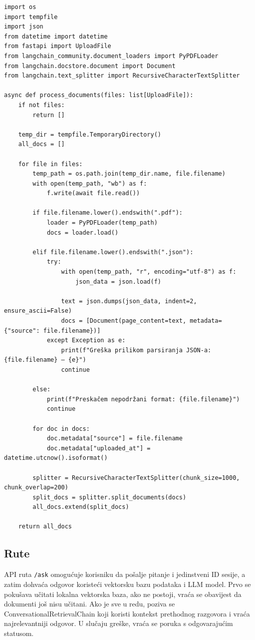 \documentclass[]{foi}
\begin{document}
\begin{longlisting}
\begin{verbatim}
import os
import tempfile
import json
from datetime import datetime
from fastapi import UploadFile
from langchain_community.document_loaders import PyPDFLoader
from langchain.docstore.document import Document
from langchain.text_splitter import RecursiveCharacterTextSplitter

async def process_documents(files: list[UploadFile]):
    if not files:
        return []

    temp_dir = tempfile.TemporaryDirectory()
    all_docs = []

    for file in files:
        temp_path = os.path.join(temp_dir.name, file.filename)
        with open(temp_path, "wb") as f:
            f.write(await file.read())

        if file.filename.lower().endswith(".pdf"):
            loader = PyPDFLoader(temp_path)
            docs = loader.load()

        elif file.filename.lower().endswith(".json"):
            try:
                with open(temp_path, "r", encoding="utf-8") as f:
                    json_data = json.load(f)

                text = json.dumps(json_data, indent=2, ensure_ascii=False)
                docs = [Document(page_content=text, metadata={"source": file.filename})]
            except Exception as e:
                print(f"Greška prilikom parsiranja JSON-a: {file.filename} — {e}")
                continue

        else:
            print(f"Preskačem nepodržani format: {file.filename}")
            continue 

        for doc in docs:
            doc.metadata["source"] = file.filename
            doc.metadata["uploaded_at"] = datetime.utcnow().isoformat()

        splitter = RecursiveCharacterTextSplitter(chunk_size=1000, chunk_overlap=200)
        split_docs = splitter.split_documents(docs)
        all_docs.extend(split_docs)

    return all_docs
\end{verbatim}
\caption{\texttt{Document\_handler.py}}
\label{lst:documenthandler}
\end{longlisting}

\subsection{Rute}
API ruta \verb|/ask| omogućuje korisniku da pošalje pitanje i jedinstveni ID sesije, a zatim dohvaća odgovor koristeći vektorsku bazu podataka i LLM model.
Prvo se pokušava učitati lokalna vektorska baza, ako ne postoji, vraća se obavijest da dokumenti još nisu učitani. Ako je sve u redu, poziva se
ConversationalRetrievalChain koji koristi kontekst prethodnog razgovora i vraća najrelevantniji odgovor. U slučaju greške, vraća se poruka
s odgovarajućim statusom.
\end{document}

